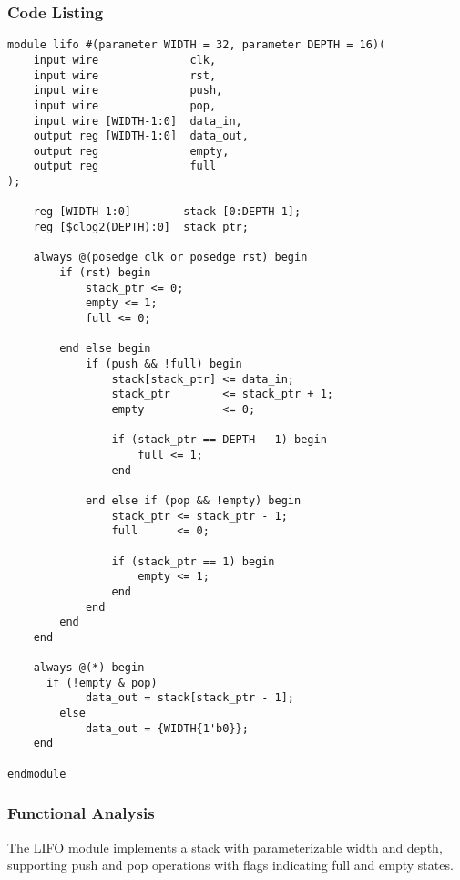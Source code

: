 \documentclass[10pt]{article}
\begin{document}
\subsubsection{Code Listing}
\begin{verbatim}
module lifo #(parameter WIDTH = 32, parameter DEPTH = 16)(
    input wire              clk,
    input wire              rst,
    input wire              push,
    input wire              pop,
    input wire [WIDTH-1:0]  data_in,
    output reg [WIDTH-1:0]  data_out,
    output reg              empty,
    output reg              full
);

    reg [WIDTH-1:0]        stack [0:DEPTH-1];
    reg [$clog2(DEPTH):0]  stack_ptr;

    always @(posedge clk or posedge rst) begin
        if (rst) begin
            stack_ptr <= 0;
            empty <= 1;
            full <= 0;

        end else begin
            if (push && !full) begin
                stack[stack_ptr] <= data_in;
                stack_ptr        <= stack_ptr + 1;
                empty            <= 0;

                if (stack_ptr == DEPTH - 1) begin
                    full <= 1;
                end

            end else if (pop && !empty) begin
                stack_ptr <= stack_ptr - 1;
                full      <= 0;

                if (stack_ptr == 1) begin
                    empty <= 1;
                end
            end
        end
    end

    always @(*) begin
      if (!empty & pop)
            data_out = stack[stack_ptr - 1];
        else
            data_out = {WIDTH{1'b0}};
    end

endmodule
\end{verbatim}

\subsubsection{Functional Analysis}
The LIFO module implements a stack with parameterizable width and depth, supporting push and pop operations with flags indicating full and empty states.
\end{document}
